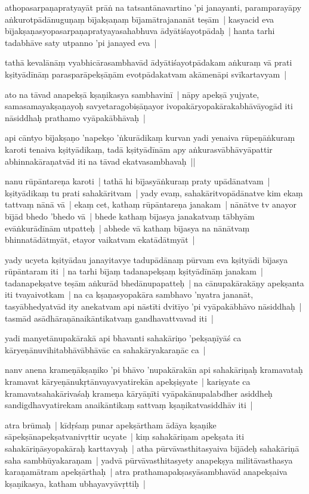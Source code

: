 \documentclass[article,12pt,a4paper]{memoir}
\begin{document}
	  \pstart athopasarpaṇapratyayāt prāṅ na tatsantānavartino 'pi janayanti, paramparayāpy aṅkurotpādānuguṇaṃ bījakṣaṇaṃ bījamātrajananāt teṣām | kasyacid eva bījakṣaṇasyopasarpaṇapratyayasahabhuva ādyātiśayotpādaḥ | hanta tarhi tadabhāve saty utpanno 'pi janayed eva | 
	\pend
      

	  \pstart tathā kevalānāṃ vyabhicārasambhavād ādyātiśayotpādakam aṅkuraṃ vā prati kṣityādīnāṃ parasparāpekṣāṇām evotpādakatvam akāmenāpi svīkartavyam | 
	\pend
      

	  \pstart ato na tāvad anapekṣā kṣaṇikasya sambhavinī | nāpy apekṣā yujyate, samasamayakṣaṇayoḥ savyetaragobiṣāṇayor ivopakāryopakārakabhāvāyogād iti nāsiddhaḥ prathamo vyāpakābhāvaḥ |
	\pend
      

	  \pstart api cāntyo bījakṣaṇo 'napekṣo 'ṅkurādikaṃ kurvan yadi yenaiva rūpeṇāṅkuraṃ karoti tenaiva kṣityādikaṃ, tadā kṣityādīnām apy aṅkurasvābhāvyāpattir abhinnakāraṇatvād iti na tāvad ekatvasambhavaḥ ||
	\pend
      

	  \pstart nanu rūpāntareṇa karoti | tathā hi bījasyāṅkuraṃ praty upādānatvam | kṣityādikaṃ tu prati sahakāritvam | yady evaṃ, sahakāritvopādānatve kim ekaṃ tattvaṃ nānā vā | ekaṃ cet, kathaṃ rūpāntareṇa janakam | nānātve tv anayor bījād bhedo 'bhedo vā | bhede kathaṃ bījasya janakatvaṃ tābhyām evāṅkurādīnām utpatteḥ | abhede vā kathaṃ bījasya na nānātvaṃ bhinnatādātmyāt, etayor vaikatvam ekatādātmyāt |
	\pend
      

	  \pstart yady ucyeta kṣityādau janayitavye tadupādānaṃ pūrvam eva kṣityādi bījasya rūpāntaram iti | na tarhi bījaṃ tadanapekṣaṃ kṣityādīnāṃ janakam | tadanapekṣatve teṣām aṅkurād bhedānupapatteḥ | na cānupakārakāṇy apekṣanta iti tvayaivotkam | na ca kṣaṇasyopakāra sambhavo 'nyatra jananāt, tasyābhedyatvād ity anekatvam api nāstīti dvitīyo 'pi vyāpakābhāvo nāsiddhaḥ | tasmād asādhāraṇānaikāntikatvaṃ gandhavattvavad iti |
	\pend
      

	  \pstart yadi manyetānupakārakā api bhavanti sahakāriṇo 'pekṣaṇīyāś ca kāryeṇānuvihitabhāvābhāvāc ca sahakāryakaraṇāc ca |
	\pend
      

	  \pstart nanv anena krameṇākṣaṇiko 'pi bhāvo 'nupakārakān api sahakāriṇaḥ kramavataḥ kramavat kāryeṇānukṛtānvayavyatirekān apekṣiṣyate | kariṣyate ca kramavatsahakārivaśaḥ krameṇa kāryāṇīti vyāpakānupalabdher asiddheḥ sandigdhavyatirekam anaikāntikaṃ sattvaṃ kṣaṇikatvasiddhāv iti |
	\pend
      

	  \pstart atra brūmaḥ | kīdṛśaṃ punar apekṣārtham ādāya kṣaṇike sāpekṣānapekṣatvanivṛttir ucyate | kiṃ sahakāriṇam apekṣata iti sahakāriṇāsyopakāraḥ karttavyaḥ | atha pūrvāvasthitasyaiva bījādeḥ sahakāriṇā saha sambhūyakaraṇam | yadvā pūrvāvasthitasyety anapekṣya militāvasthasya karaṇamātram apekṣārthaḥ | atra prathamapakṣasyāsambhavād anapekṣaiva kṣaṇikasya, katham ubhayavyāvṛttiḥ | 
	\pend
      
\end{document}
